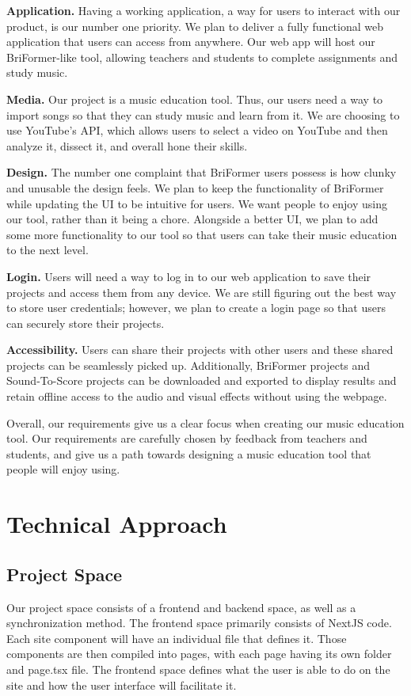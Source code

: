 \documentclass[12pt, letterpaper]{article}
\begin{document}
\textbf{Application.} Having a working application, a way for users to interact with our product, is our number one priority. We plan to deliver a fully functional web application that users can access from anywhere. Our web app will host our BriFormer-like tool, allowing teachers and students to complete assignments and study music.

\textbf{Media.} Our project is a music education tool. Thus, our users need a way to import songs so that they can study music and learn from it. We are choosing to use YouTube's API, which allows users to select a video on YouTube and then analyze it, dissect it, and overall hone their skills.

\textbf{Design.} The number one complaint that BriFormer users possess is how clunky and unusable the design feels. We plan to keep the functionality of BriFormer while updating the UI to be intuitive for users. We want people to enjoy using our tool, rather than it being a chore. Alongside a better UI, we plan to add some more functionality to our tool so that users can take their music education to the next level.

\textbf{Login.} Users will need a way to log in to our web application to save their projects and access them from any device. We are still figuring out the best way to store user credentials; however, we plan to create a login page so that users can securely store their projects.

\textbf{Accessibility.} Users can share their projects with other users and these shared projects can be seamlessly picked up. Additionally, BriFormer projects and Sound-To-Score projects can be downloaded and exported to display results and retain offline access to the audio and visual effects without using the webpage. 

Overall, our requirements give us a clear focus when creating our music education tool. Our requirements are carefully chosen by feedback from teachers and students, and give us a path towards designing a music education tool that people will enjoy using.

\section*{Technical Approach}
\subsection*{Project Space}
Our project space consists of a frontend and backend space, as well as a synchronization method. The frontend space primarily consists of NextJS code. Each site component will have an individual file that defines it. Those components are then compiled into pages, with each page having its own folder and page.tsx file. The frontend space defines what the user is able to do on the site and how the user interface will facilitate it. 
\end{document}
